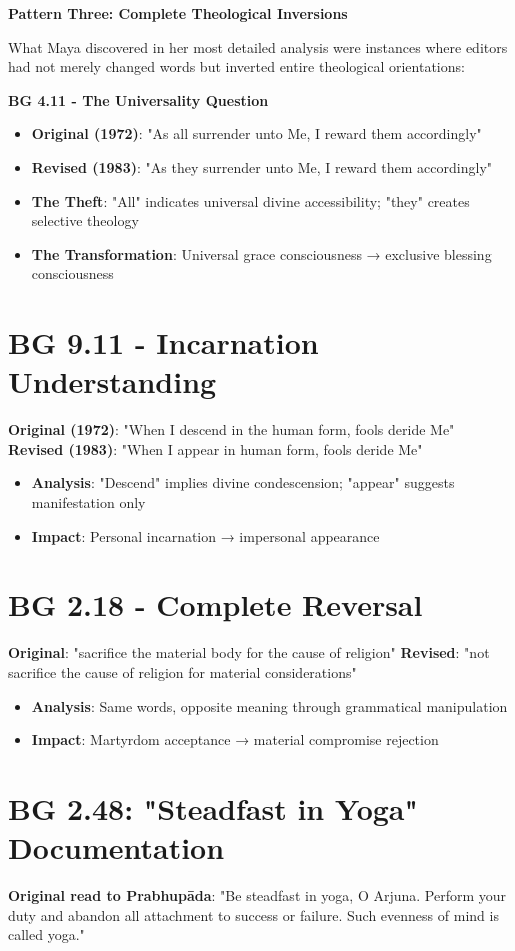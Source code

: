 \documentclass[11pt,twoside]{book}
\begin{document}
\textbf{\textbf{Pattern Three: Complete Theological Inversions}}

What Maya discovered in her most detailed analysis were instances where editors had not merely changed words but inverted entire theological orientations:

\textbf{\textbf{BG 4.11 - The Universality Question}}
\begin{itemize}
\item \textbf{\textbf{Original (1972)}}: "As all surrender unto Me, I reward them accordingly"
\item \textbf{\textbf{Revised (1983)}}: "As they surrender unto Me, I reward them accordingly"
\item \textbf{\textbf{The Theft}}: "All" indicates universal divine accessibility; "they" creates selective theology
\item \textbf{\textbf{The Transformation}}: Universal grace consciousness → exclusive blessing consciousness
\end{itemize}
\section*{BG 9.11 - Incarnation Understanding}
\label{sec:orgd5fc0de}
\textbf{\textbf{Original (1972)}}: "When I descend in the human form, fools deride Me"
\textbf{\textbf{Revised (1983)}}: "When I appear in human form, fools deride Me"
\begin{itemize}
\item \textbf{\textbf{Analysis}}: "Descend" implies divine condescension; "appear" suggests manifestation only
\item \textbf{\textbf{Impact}}: Personal incarnation → impersonal appearance
\end{itemize}
\section*{BG 2.18 - Complete Reversal}
\label{sec:orgbc75749}
\textbf{\textbf{Original}}: "sacrifice the material body for the cause of religion" 
\textbf{\textbf{Revised}}: "not sacrifice the cause of religion for material considerations"
\begin{itemize}
\item \textbf{\textbf{Analysis}}: Same words, opposite meaning through grammatical manipulation
\item \textbf{\textbf{Impact}}: Martyrdom acceptance → material compromise rejection
\end{itemize}
\section*{BG 2.48: "Steadfast in Yoga" Documentation}
\label{sec:org3b89cb5}
\textbf{\textbf{Original read to Prabhupāda}}: "Be steadfast in yoga, O Arjuna. Perform your duty and abandon all attachment to success or failure. Such evenness of mind is called yoga."
\end{document}
